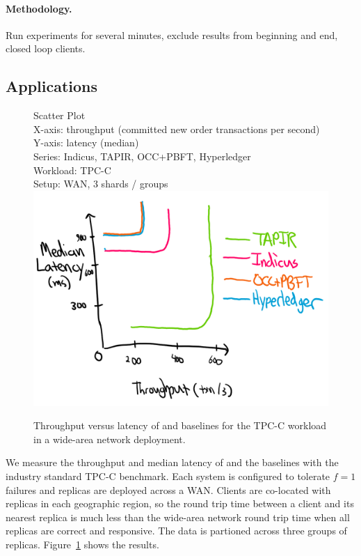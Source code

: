 \paragraph{Methodology.} Run experiments for several minutes, exclude results
from beginning and end, closed loop clients.

\subsection{Applications}

\begin{figure}
  Scatter Plot\\
  X-axis: throughput (committed new order transactions per second)\\
  Y-axis: latency (median)\\
  Series: Indicus, TAPIR, OCC+PBFT, Hyperledger\\
  Workload: TPC-C\\
  Setup: WAN, 3 shards / groups\\
  \includegraphics[width=\columnwidth]{figures/eval/tpcc-tput-lat.png}
  \caption{Throughput versus latency of \sys{} and baselines for the TPC-C
  workload in a wide-area network deployment.}
  \label{fig:tpcc-tput-lat}
\end{figure}

We measure the throughput and median latency of \sys{} and the baselines with the
industry standard TPC-C benchmark. Each system is configured to tolerate $f=1$
failures and replicas are deployed across a WAN. Clients are co-located with
replicas in each geographic region, so the round trip time between a client and
its nearest replica is much less than the wide-area network round trip time when
all replicas are correct and responsive. The data is partioned across
three groups of replicas. Figure~\ref{fig:tpcc-tput-lat} shows the results.

